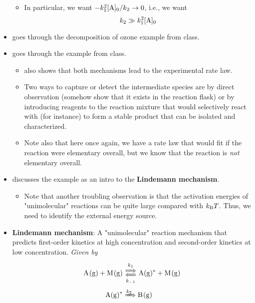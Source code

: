 \documentclass[../notes.tex]{subfiles}
\begin{document}
\begin{itemize}
\begin{itemize}
        \item In particular, we want $-k_1^2\cnc[0]{A}/k_2\to 0$, i.e., we want
        \begin{equation*}
            k_2 \gg k_1^2\cnc[0]{A}
        \end{equation*}
    \end{itemize}
    \item \textcite{bib:McQuarrieSimon} goes through the decomposition of ozone example from class.
    \item \textcite{bib:McQuarrieSimon} goes through the  example from class.
    \begin{itemize}
        \item \textcite{bib:McQuarrieSimon} also shows that both mechanisms lead to the experimental rate law.
        \item Two ways to capture or detect the intermediate species are by direct observation (somehow show that it exists in the reaction flask) or by introducing reagents to the reaction mixture that would selectively react with  (for instance) to form a stable product that can be isolated and characterized.
        \item Note also that here once again, we have a rate law that would fit if the reaction were elementary overall, but we know that the reaction is \emph{not} elementary overall.
    \end{itemize}
    \item \textcite{bib:McQuarrieSimon} discusses the  example as an intro to the \textbf{Lindemann mechanism}.
    \begin{itemize}
        \item Note that another troubling observation is that the activation energies of "unimolecular" reactions can be quite large compared with $k_\text{B} T$. Thus, we need to identify the external energy source.
    \end{itemize}
    \item \textbf{Lindemann mechanism}: A "unimolecular" reaction mechanism that predicts first-order kinetics at high concentration and second-order kinetics at low concentration. \emph{Given by}
    \begin{align*}
        \ce{A(g) + M(g)} &\Longleftrightarrows[k_1][k_{-1}] \ce{A(g)^* + M(g)}\\
        \ce{A(g)^*} &\xRightarrow{k_2} \ce{B(g)}
    \end{align*}
    \begin{itemize}

\end{itemize}
\end{itemize}
\end{document}
